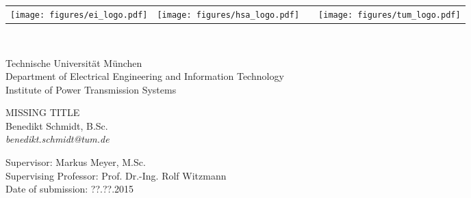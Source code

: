 \begin{titlepage}
	
	\begin{flushleft}
		\begin{tabularx}{\linewidth}{@{}llXr@{}}
			\texttt{[image: figures/ei\_logo.pdf]} &	
			\texttt{[image: figures/hsa\_logo.pdf]} & 
			& 
			\texttt{[image: figures/tum\_logo.pdf]}
		\end{tabularx}
	\end{flushleft}
	\hfill \\[1cm]
	
	\begin{flushleft}
		Technische Universität München \\
		Department of Electrical Engineering and Information Technology \\
		Institute of Power Transmission Systems \\[4cm]
	\end{flushleft}
		
	\begin{center}
		\huge
		MISSING TITLE \\[1cm]
		\large
		Benedikt Schmidt, B.Sc. \\
		\textit{benedikt.schmidt@tum.de} \\[7cm]
	\end{center}
	
	\begin{flushleft}
		Supervisor: Markus Meyer, M.Sc. \\
		Supervising Professor: Prof. Dr.-Ing. Rolf Witzmann \\
		Date of submission: ??.??.2015
	\end{flushleft}
\end{titlepage}